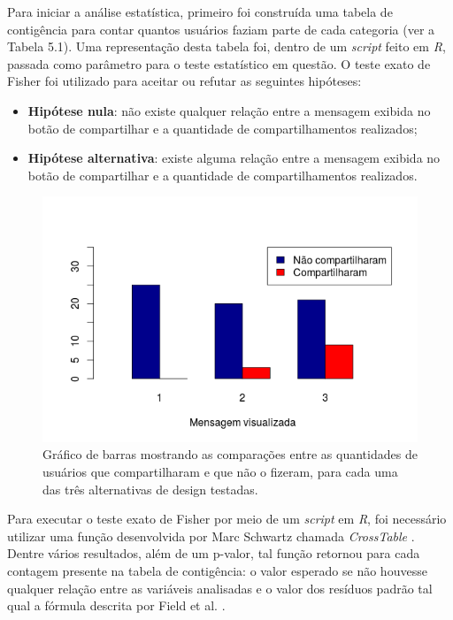     Para iniciar a análise estatística, primeiro foi construída uma tabela de contigência para contar quantos usuários faziam parte de cada categoria (ver a Tabela 5.1). Uma representação desta tabela foi, dentro de um \textit{script} feito em \textit{R}, passada como parâmetro para o teste estatístico em questão. O teste exato de Fisher foi utilizado para aceitar ou refutar as seguintes hipóteses:
    \begin{itemize}
        \item \textbf{Hipótese nula}: não existe qualquer relação entre a mensagem exibida no botão de compartilhar e a quantidade de compartilhamentos realizados;
        \item \textbf{Hipótese alternativa}: existe alguma relação entre a mensagem exibida no botão de compartilhar e a quantidade de compartilhamentos realizados.
    \end{itemize}
    
    \begin{figure}[H]
        \center
        \includegraphics[scale=0.7]{./figuras/barchart-compartilhamentos.png}
        \caption{Gráfico de barras mostrando as comparações entre as quantidades de usuários que compartilharam e que não o fizeram, para cada uma das três alternativas de design testadas.}
        \label{fig:barchart1}
    \end{figure}
    
    Para executar o teste exato de Fisher por meio de um \textit{script} em \textit{R}, foi necessário utilizar uma função desenvolvida por Marc Schwartz chamada \textit{CrossTable} \cite{crosstable}. Dentre vários resultados, além de um p-valor, tal função retornou para cada contagem presente na tabela de contigência: o valor esperado se não houvesse qualquer relação entre as variáveis analisadas e o valor dos resíduos padrão tal qual a fórmula descrita por Field et al. \cite{field2012discovering}. 

